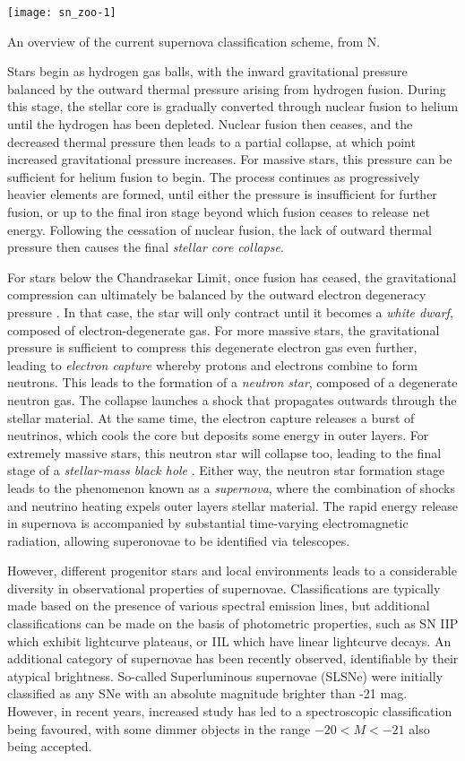 \begin{marginfigure}
	\texttt{[image: sn\_zoo-1]}
	\caption{An overview of the current supernova classification scheme, from N.}
	\label{fig:snzoo}
\end{marginfigure}

Stars begin as hydrogen gas balls, with the inward gravitational pressure balanced by the outward thermal pressure arising from hydrogen fusion. During this stage, the stellar core is gradually converted through nuclear fusion to helium until the hydrogen has been depleted. Nuclear fusion then ceases, and the decreased thermal pressure then leads to a partial collapse, at which point increased gravitational pressure increases. For massive stars, this pressure can be sufficient for helium fusion to begin. The process continues as progressively heavier elements are formed, until either the pressure is insufficient for further fusion, or up to the final iron stage beyond which fusion ceases to release net energy. Following the cessation of nuclear fusion, the lack of outward thermal pressure then causes the final \emph{stellar core collapse}.

For stars below the Chandrasekar Limit, once fusion has ceased, the gravitational compression can ultimately be balanced by the outward electron degeneracy pressure . In that case, the star will only contract until it becomes a \emph{white dwarf}, composed of electron-degenerate gas. For more massive stars, the gravitational pressure is sufficient to compress this degenerate electron gas even further, leading to \emph{electron capture} whereby protons and electrons combine to form neutrons. This leads to the formation of a \emph{neutron star}, composed of a degenerate neutron gas. The collapse launches a shock that propagates outwards through the stellar material. At the same time, the electron capture releases a burst of neutrinos, which cools the core but deposits some energy in outer layers. For extremely massive stars, this neutron star will collapse too, leading to the final stage of a \emph{stellar-mass black hole} . Either way, the neutron star formation stage leads to the phenomenon known as a \emph{supernova}, where the combination of shocks and neutrino heating expels outer layers stellar material. The rapid energy release in supernova is accompanied by substantial time-varying electromagnetic radiation, allowing superonovae to be identified via telescopes.

However, different progenitor stars and local environments leads to a considerable diversity in observational properties of supernovae. Classifications are typically made based on the presence of various spectral emission lines, but additional classifications can be made on the basis of photometric properties, such as SN IIP which exhibit lightcurve plateaus, or IIL which have linear lightcurve decays. An additional category of supernovae has been recently observed, identifiable by their atypical brightness. So-called Superluminous supernovae (SLSNe) were initially classified as any SNe with an absolute magnitude brighter than -21 mag. However, in recent years, increased study has led to a spectroscopic classification being favoured, with some dimmer objects in the range $-20 < M < -21$ also being accepted. 

